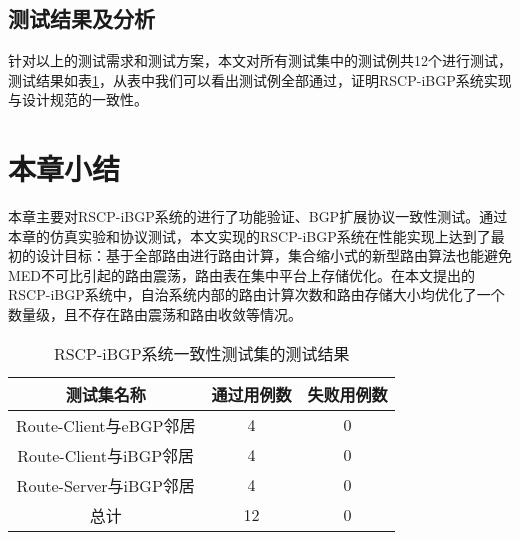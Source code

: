 \subsection{测试结果及分析}

针对以上的测试需求和测试方案，本文对所有测试集中的测试例共12个进行测试，测试结果如表\ref{tab:res}，从表中我们可以看出测试例全部通过，证明RSCP-iBGP系统实现与设计规范的一致性。



\section{本章小结}

本章主要对RSCP-iBGP系统的进行了功能验证、BGP扩展协议一致性测试。通过本章的仿真实验和协议测试，本文实现的RSCP-iBGP系统在性能实现上达到了最初的设计目标：基于全部路由进行路由计算，集合缩小式的新型路由算法也能避免MED不可比引起的路由震荡，路由表在集中平台上存储优化。在本文提出的RSCP-iBGP系统中，自治系统内部的路由计算次数和路由存储大小均优化了一个数量级，且不存在路由震荡和路由收敛等情况。
\begin{table}[]
\centering
\caption{RSCP-iBGP系统一致性测试集的测试结果}
\label{tab:res}
\begin{tabular}{@{}ccc@{}}
\toprule
测试集名称               & 通过用例数 & 失败用例数 \\ \midrule
Route-Client与eBGP邻居 & 4     & 0     \\
Route-Client与iBGP邻居 & 4     & 0     \\
Route-Server与iBGP邻居 & 4     & 0     \\
总计                  & 12    & 0     \\ \bottomrule
\end{tabular}
\end{table}